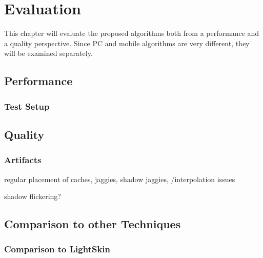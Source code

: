 \documentclass[thesis.tex]{subfiles}
\begin{document}
\chapter{Evaluation}
This chapter will evaluate the proposed algorithms both from a performance and a quality perspective. Since PC and mobile algorithms are very different, they will be examined separately.

\section{Performance}

\subsection{Test Setup}

\newpage

\section{Quality}

\subsection{Artifacts}

regular placement of caches, jaggies,
shadow jaggies,
/interpolation issues

shadow flickering?


\section{Comparison to other Techniques}

\subsection{Comparison to LightSkin}

\subfilebib %
\end{document}
